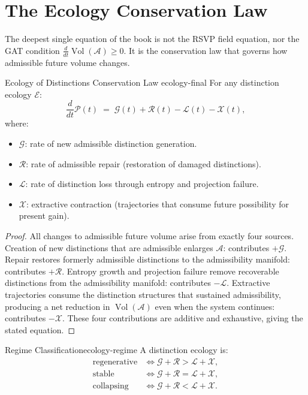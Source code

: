 \documentclass[12pt,twoside,openright]{book}
\newcommand{\adm}{\mathcal{A}}
\newcommand{\Vol}{\operatorname{Vol}}
\begin{document}
\section{The Ecology Conservation Law}
\label{sec:ch30-conservation}

The deepest single equation of the book is not the
RSVP field equation, nor the GAT condition
$\frac{d}{dt}\Vol(\adm) \ge 0$.
It is the conservation law that governs how admissible
future volume changes.

\begin{theorem}{Ecology of Distinctions Conservation Law}%
  {ecology-final}
  For any distinction ecology $\mathcal{E}$:
  \[
    \frac{d}{dt}\mathcal{P}(t)
    \;=\;
    \mathcal{G}(t) + \mathcal{R}(t)
    - \mathcal{L}(t) - \mathcal{X}(t),
  \]
  where:
  \begin{itemize}[nosep]
    \item $\mathcal{G}$: rate of new admissible
          distinction generation.
    \item $\mathcal{R}$: rate of admissible repair
          (restoration of damaged distinctions).
    \item $\mathcal{L}$: rate of distinction loss
          through entropy and projection failure.
    \item $\mathcal{X}$: extractive contraction
          (trajectories that consume future possibility
          for present gain).
  \end{itemize}
\end{theorem}

\begin{proof}
  All changes to admissible future volume arise from
  exactly four sources.
  Creation of new distinctions that are admissible
  enlarges $\adm$: contributes $+\mathcal{G}$.
  Repair restores formerly admissible distinctions
  to the admissibility manifold: contributes $+\mathcal{R}$.
  Entropy growth and projection failure remove recoverable
  distinctions from the admissibility manifold:
  contributes $-\mathcal{L}$.
  Extractive trajectories consume the distinction
  structures that sustained admissibility, producing
  a net reduction in $\Vol(\adm)$ even when the system
  continues: contributes $-\mathcal{X}$.
  These four contributions are additive and exhaustive,
  giving the stated equation.
\end{proof}

\begin{corollary}{Regime Classification}{ecology-regime}
  A distinction ecology is:
  \begin{align*}
    \text{regenerative} &\iff
    \mathcal{G}+\mathcal{R} > \mathcal{L}+\mathcal{X}, \\
    \text{stable}       &\iff
    \mathcal{G}+\mathcal{R} = \mathcal{L}+\mathcal{X}, \\
    \text{collapsing}   &\iff
    \mathcal{G}+\mathcal{R} < \mathcal{L}+\mathcal{X}.
  \end{align*}
\end{corollary}
\end{document}
